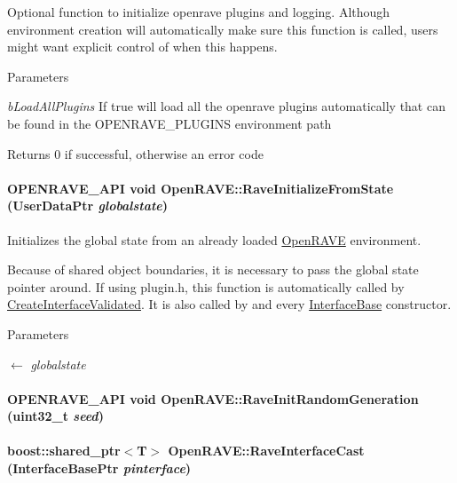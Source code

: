 Optional function to initialize openrave plugins and logging. Although environment creation will automatically make sure this function is called, users might want explicit control of when this happens. 
\begin{DoxyParams}{Parameters}
\item[{\em bLoadAllPlugins}]If true will load all the openrave plugins automatically that can be found in the OPENRAVE\_\-PLUGINS environment path \end{DoxyParams}
\begin{DoxyReturn}{Returns}
0 if successful, otherwise an error code 
\end{DoxyReturn}
\hypertarget{namespaceOpenRAVE_a4acb966ec91e783a5d3a5967583bb2c0}{
\paragraph[{RaveInitializeFromState}]{\setlength{\rightskip}{0pt plus 5cm}OPENRAVE\_\-API void OpenRAVE::RaveInitializeFromState (UserDataPtr {\em globalstate})}\hfill}
\label{namespaceOpenRAVE_a4acb966ec91e783a5d3a5967583bb2c0}


Initializes the global state from an already loaded \hyperlink{namespaceOpenRAVE}{OpenRAVE} environment. 

Because of shared object boundaries, it is necessary to pass the global state pointer around. If using plugin.h, this function is automatically called by \hyperlink{group__plugin__exports_ga468c900067e08689383b3f8da642141f}{CreateInterfaceValidated}. It is also called by and every \hyperlink{classOpenRAVE_1_1InterfaceBase}{InterfaceBase} constructor. 
\begin{DoxyParams}{Parameters}
\item[\mbox{$\leftarrow$} {\em globalstate}]\end{DoxyParams}
\hypertarget{namespaceOpenRAVE_af3e449c98bda910013e4b323573306d1}{
\paragraph[{RaveInitRandomGeneration}]{\setlength{\rightskip}{0pt plus 5cm}OPENRAVE\_\-API void OpenRAVE::RaveInitRandomGeneration (uint32\_\-t {\em seed})}\hfill}
\label{namespaceOpenRAVE_af3e449c98bda910013e4b323573306d1}
\hypertarget{namespaceOpenRAVE_a5f46fb9ff755f614ea5636851a89952c}{
\paragraph[{RaveInterfaceCast}]{\setlength{\rightskip}{0pt plus 5cm}boost::shared\_\-ptr$<$T$>$ OpenRAVE::RaveInterfaceCast (InterfaceBasePtr {\em pinterface})}\hfill}
\label{namespaceOpenRAVE_a5f46fb9ff755f614ea5636851a89952c}



